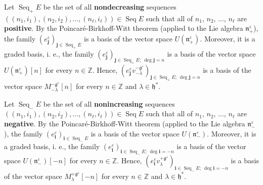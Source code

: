 \documentclass[etingof-lie.tex]{subfiles}
\begin{document}
\begin{Convention}
Let $\operatorname*{Seq}\nolimits_{+}E$ be the set of all
\textbf{nondecreasing} sequences $\left(  \left(  n_{1},i_{1}\right)  ,\left(
n_{2},i_{2}\right)  ,...,\left(  n_{\ell},i_{\ell}\right)  \right)
\in\operatorname*{Seq}E$ such that all of $n_{1}$, $n_{2}$, $...$, $n_{\ell}$
are \textbf{positive}. By the Poincar\'{e}-Birkhoff-Witt theorem (applied to
the Lie algebra $\mathfrak{n}_{+}^{\varepsilon}$), the family $\left(
e_{\mathbf{j}}^{\varepsilon}\right)  _{\mathbf{j}\in\operatorname*{Seq}%
\nolimits_{+}E}$ is a basis of the vector space $U\left(  \mathfrak{n}%
_{+}^{\varepsilon}\right)  $. Moreover, it is a graded basis, i. e., the
family $\left(  e_{\mathbf{j}}^{\varepsilon}\right)  _{\mathbf{j}%
\in\operatorname*{Seq}\nolimits_{+}E;\ \deg\mathbf{j}=n}$ is a basis of the
vector space $U\left(  \mathfrak{n}_{+}^{\varepsilon}\right)  \left[
n\right]  $ for every $n\in\mathbb{Z}$. Hence, $\left(  e_{\mathbf{j}%
}^{\varepsilon}v_{-\lambda}^{-\mathfrak{g}^{\varepsilon}}\right)
_{\mathbf{j}\in\operatorname*{Seq}\nolimits_{+}E;\ \deg\mathbf{j}=n}$ is a
basis of the vector space $M_{-\lambda}^{-\mathfrak{g}^{\varepsilon}}\left[
n\right]  $ for every $n\in\mathbb{Z}$ and $\lambda\in\mathfrak{h}^{\ast}$.

Let $\operatorname*{Seq}\nolimits_{-}E$ be the set of all
\textbf{nonincreasing} sequences $\left(  \left(  n_{1},i_{1}\right)  ,\left(
n_{2},i_{2}\right)  ,...,\left(  n_{\ell},i_{\ell}\right)  \right)
\in\operatorname*{Seq}E$ such that all of $n_{1}$, $n_{2}$, $...$, $n_{\ell}$
are \textbf{negative}. By the Poincar\'{e}-Birkhoff-Witt theorem (applied to
the Lie algebra $\mathfrak{n}_{-}^{\varepsilon}$), the family $\left(
e_{\mathbf{i}}^{\varepsilon}\right)  _{\mathbf{i}\in\operatorname*{Seq}%
\nolimits_{-}E}$ is a basis of the vector space $U\left(  \mathfrak{n}%
_{-}^{\varepsilon}\right)  $. Moreover, it is a graded basis, i. e., the
family $\left(  e_{\mathbf{i}}^{\varepsilon}\right)  _{\mathbf{i}%
\in\operatorname*{Seq}\nolimits_{-}E;\ \deg\mathbf{i}=-n}$ is a basis of the
vector space $U\left(  \mathfrak{n}_{-}^{\varepsilon}\right)  \left[
-n\right]  $ for every $n\in\mathbb{Z}$. Hence, $\left(  e_{\mathbf{i}%
}^{\varepsilon}v_{\lambda}^{+\mathfrak{g}^{\varepsilon}}\right)
_{\mathbf{i}\in\operatorname*{Seq}\nolimits_{-}E;\ \deg\mathbf{i}=-n}$ is a
basis of the vector space $M_{\lambda}^{+\mathfrak{g}^{\varepsilon}}\left[
-n\right]  $ for every $n\in\mathbb{Z}$ and $\lambda\in\mathfrak{h}^{\ast}$.


\end{Convention}
\end{document}
